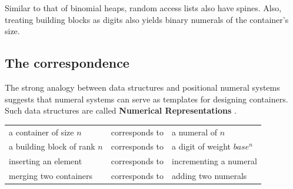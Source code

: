 \documentclass[\main/thesis.tex]{subfiles}
\begin{document}
\begin{center}
\end{center}

Similar to that of binomial heaps, random access lists also have spines.
Also, treating building blocks as digits also yields binary numerals of the
container's size.

\subsection{The correspondence}

The strong analogy between data structures and positional numeral systems
suggests that numeral systems can serve as templates for designing containers.
Such data structures are called \textbf{Numerical Representations}\cite{okasaki1996purely}
\cite{hinze1998numerical}.

\begin{center}
    \begin{adjustbox}{max width=\textwidth}
    \begin{tabular}{ l l l }
    a container of size $ n $ & corresponds to & a numeral of $ n $ \\
    a building block of rank $ n $ & corresponds to & a digit of weight $ base^n $ \\
    inserting an element      & corresponds to & incrementing a numeral \\
    merging two containers    & corresponds to & adding two numerals \\
    \end{tabular}
    \end{adjustbox}
\end{center}
\end{document}
